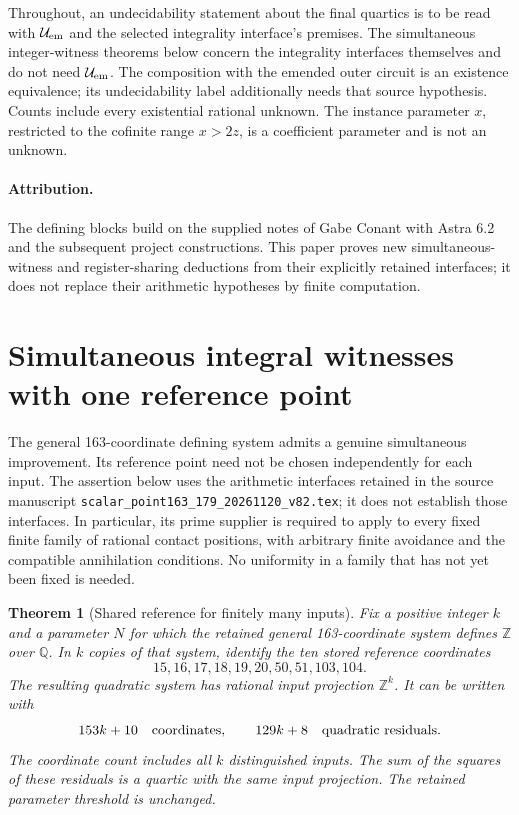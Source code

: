 \documentclass[11pt]{article}
\newtheorem{theorem}{Theorem}
\begin{document}
Throughout, an undecidability statement about the final quartics is to
be read with \(\mathcal U_{\rm em}\) and the selected integrality
interface's premises. The simultaneous integer-witness theorems below
concern the integrality interfaces themselves and do not need
\(\mathcal U_{\rm em}\). The composition with the emended outer circuit
is an existence equivalence; its undecidability label additionally needs
that source hypothesis. Counts include every existential rational
unknown. The instance parameter \(x\), restricted to the cofinite range
\(x>2z\), is a coefficient parameter and is not an unknown.

\paragraph{Attribution.}
The defining blocks build on the supplied notes of Gabe Conant with
Astra 6.2 and the subsequent project constructions. This paper proves
new simultaneous-witness and register-sharing deductions from their
explicitly retained interfaces; it does not replace their arithmetic
hypotheses by finite computation.

\section{Simultaneous integral witnesses with one reference point}
\label{sec:shared-reference}

The general 163-coordinate defining system admits a genuine simultaneous
improvement.  Its reference point need not be chosen independently for
each input.  The assertion below uses the arithmetic interfaces retained
in the source manuscript
\texttt{scalar\_point163\_179\_20261120\_v82.tex}; it does not establish
those interfaces.  In particular, its prime supplier is required to
apply to every fixed finite family of rational contact positions, with
arbitrary finite avoidance and the compatible annihilation conditions.
No uniformity in a family that has not yet been fixed is needed.

\begin{theorem}[Shared reference for finitely many inputs]
\label{thm:shared-reference}
Fix a positive integer $k$ and a parameter $N$ for which the retained
general 163-coordinate system defines $\mathbb Z$ over $\mathbb Q$.
In $k$ copies of that system, identify the ten stored reference
coordinates
\[
                 15,16,17,18,19,20,50,51,103,104.
\]
The resulting quadratic system has rational input projection
$\mathbb Z^k$.  It can be written with
\[
                  153k+10\quad\hbox{coordinates},\qquad
                  129k+8\quad\hbox{quadratic residuals}.
\]
The coordinate count includes all $k$ distinguished inputs.  The sum
of the squares of these residuals is a quartic with the same input
projection.  The retained parameter threshold is unchanged.
\end{theorem}
\end{document}
